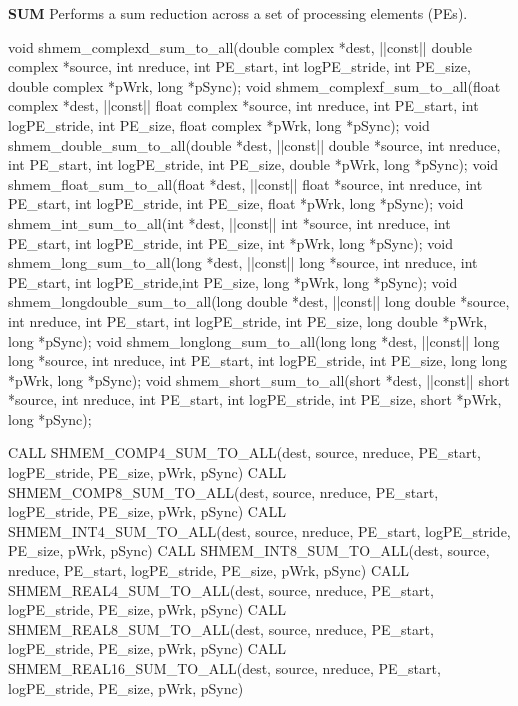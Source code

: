 \begin{apidefinition}
\bigskip
\textbf{SUM} \newline
Performs a sum reduction across a set of processing elements (\ac{PE}s).\newline
\begin{Csynopsis}
void shmem_complexd_sum_to_all(double complex *dest, |\aftergroup{}|const|\aftergroup\prevcolor| double complex *source, int nreduce, int PE_start, int logPE_stride, int PE_size, double complex *pWrk, long *pSync);
void shmem_complexf_sum_to_all(float complex *dest, |\aftergroup{}|const|\aftergroup\prevcolor| float complex *source, int nreduce, int PE_start, int logPE_stride, int PE_size, float complex *pWrk, long *pSync);
void shmem_double_sum_to_all(double *dest, |\aftergroup{}|const|\aftergroup\prevcolor| double *source, int nreduce, int PE_start, int logPE_stride, int PE_size, double *pWrk, long *pSync);
void shmem_float_sum_to_all(float *dest, |\aftergroup{}|const|\aftergroup\prevcolor| float *source, int nreduce, int PE_start, int logPE_stride, int PE_size, float *pWrk, long *pSync);
void shmem_int_sum_to_all(int *dest, |\aftergroup{}|const|\aftergroup\prevcolor| int *source, int nreduce, int PE_start, int logPE_stride, int PE_size, int *pWrk, long *pSync);
void shmem_long_sum_to_all(long *dest, |\aftergroup{}|const|\aftergroup\prevcolor| long *source, int nreduce, int PE_start, int logPE_stride,int PE_size, long *pWrk, long *pSync);
void shmem_longdouble_sum_to_all(long double *dest, |\aftergroup{}|const|\aftergroup\prevcolor| long double *source, int nreduce, int PE_start, int logPE_stride, int PE_size, long double *pWrk, long *pSync);
void shmem_longlong_sum_to_all(long long *dest, |\aftergroup{}|const|\aftergroup\prevcolor| long long *source, int nreduce, int PE_start, int logPE_stride, int PE_size, long long *pWrk, long *pSync);
void shmem_short_sum_to_all(short *dest, |\aftergroup{}|const|\aftergroup\prevcolor| short *source, int nreduce, int PE_start, int logPE_stride, int PE_size, short *pWrk, long *pSync);
\end{Csynopsis}

\begin{Fsynopsis}
CALL SHMEM_COMP4_SUM_TO_ALL(dest, source, nreduce, PE_start, logPE_stride, PE_size, pWrk, pSync)
CALL SHMEM_COMP8_SUM_TO_ALL(dest, source, nreduce, PE_start, logPE_stride, PE_size, pWrk, pSync)
CALL SHMEM_INT4_SUM_TO_ALL(dest, source, nreduce, PE_start, logPE_stride, PE_size, pWrk, pSync)
CALL SHMEM_INT8_SUM_TO_ALL(dest, source, nreduce, PE_start, logPE_stride, PE_size, pWrk, pSync)
CALL SHMEM_REAL4_SUM_TO_ALL(dest, source, nreduce, PE_start, logPE_stride, PE_size, pWrk, pSync)
CALL SHMEM_REAL8_SUM_TO_ALL(dest, source, nreduce, PE_start, logPE_stride, PE_size, pWrk, pSync)
CALL SHMEM_REAL16_SUM_TO_ALL(dest, source, nreduce, PE_start, logPE_stride, PE_size, pWrk, pSync)
\end{Fsynopsis}


\end{apidefinition}

